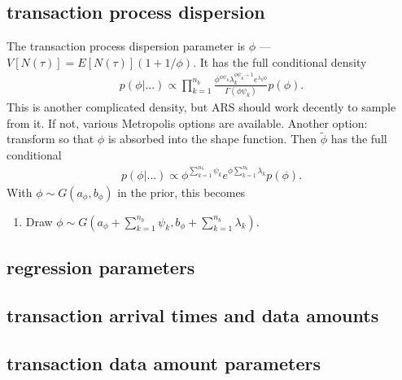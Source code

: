 \documentclass{article}
\begin{document}
\subsection{transaction process dispersion}
The transaction process dispersion parameter is $\phi$ --- $V[N(\tau)] = E[N(\tau)](1 + 1/\phi)$. It has the full conditional density
\begin{align*}
p(\phi|...) \propto \prod_{k=1}^{n_{b}}\frac{\phi^{\phi\psi_k}\lambda_k^{\phi\psi_k - 1}e^{\lambda_k\phi}}{\Gamma(\phi\psi_k)}p(\phi).
\end{align*}
This is another complicated density, but ARS should work decently to sample from it. If not, various Metropolis options are available. Another option: transform so that $\phi$ is absorbed into the shape function. Then $\tilde{\phi}$ has the full conditional
\begin{align*}
p(\phi|...) \propto \phi^{\sum_{k=1}^{n_{b}}\psi_k}e^{\phi\sum_{k=1}^{n_{b}}\lambda_k}p(\phi).
\end{align*}
With $\phi \sim G(a_\phi, b_\phi)$ in the prior, this becomes
\begin{enumerate}
\item Draw $\phi \sim G\left(a_\phi + \sum_{k=1}^{n_{b}}\psi_k, b_{\phi} + \sum_{k=1}^{n_{b}}\lambda_k \right)$.
\end{enumerate}

\subsection{regression parameters}

\subsection{transaction arrival times and data amounts}

\subsection{transaction data amount parameters}
 

\end{document}

